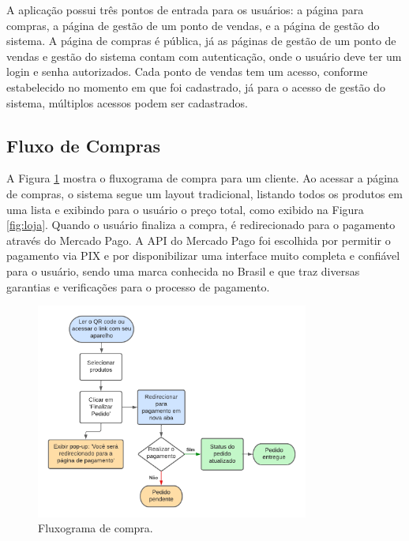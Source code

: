 A aplicação possui três pontos de entrada para os usuários: a página para compras, a página de gestão de um ponto de vendas, e a página de gestão do sistema. A página de compras é pública, já as páginas de gestão de um ponto de vendas e gestão do sistema contam com autenticação, onde o usuário deve ter um login e senha autorizados. Cada ponto de vendas tem um acesso, conforme estabelecido no momento em que foi cadastrado, já para o acesso de gestão do sistema, múltiplos acessos podem ser cadastrados. 

\subsection{Fluxo de Compras}

A Figura \ref{fig:compra} mostra o fluxograma de compra para um cliente. Ao acessar a página de compras, o sistema segue um layout tradicional, listando todos os produtos em uma lista e exibindo para o usuário o preço total, como exibido na Figura \ref{fig:loja}. Quando o usuário finaliza a compra, é redirecionado para o pagamento através do Mercado Pago. A API do Mercado Pago foi escolhida por permitir o pagamento via PIX e por disponibilizar uma interface muito completa e confiável para o usuário, sendo uma marca conhecida no Brasil e que traz diversas garantias e verificações para o processo de pagamento.

\begin{figure}
	\caption{\label{fig:compra}Fluxograma de compra.}
	\begin{center}
		\includegraphics[width=0.8\textwidth]{figuras/Diagrama compra.png}
	\end{center}
\end{figure}

